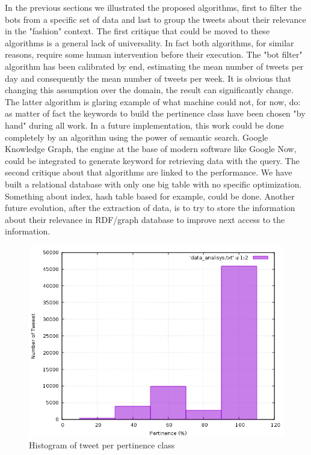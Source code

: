 \documentclass[conference, onecolumn]{IEEEtran}
\begin{document}
In the previous sections we illustrated the proposed algorithms, first to filter the bots from a specific set of data and last to group the tweets about their relevance in the "fashion" context. The first critique that could be moved to these algorithms is a general lack of universality. In fact both algorithms, for similar reasons, require some human intervention before their execution. The "bot filter" algorithm has been calibrated by end, estimating the mean number of tweets per day and consequently the mean number of tweets per week. It is obvious that changing this assumption over the domain, the result can significantly change. The latter algorithm is glaring example of what machine could not, for now, do: as matter of fact the keywords to build the pertinence class have been chosen "by hand" during all work. In a future implementation, this work could be done completely by an algorithm using the power of semantic search. Google Knowledge Graph, the engine at the base of modern software like Google Now, could be integrated to generate keyword for retrieving data with the query. The second critique about that algorithms are linked to the performance. We have built a relational database with only one big table with no specific optimization. Something about index, hash table based for example, could be done. Another future evolution, after the extraction of data, is to try to store the information about their relevance in RDF/graph database to improve next access to the information.
\begin{figure} [!htbp]
	\centering
	\vspace{0.3cm}
	\includegraphics[scale=0.56]{images/hystogram}
	\caption{Histogram of tweet per pertinence class}
	\vspace{0.3cm}
	\label{fig:histogram}
\end{figure}


\end{document}

